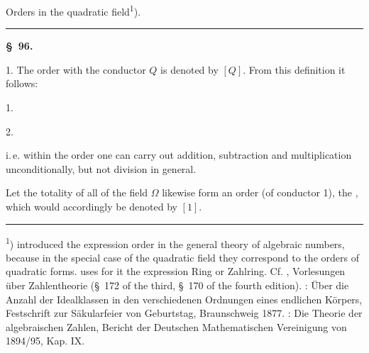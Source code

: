 
\begin{center}

Orders in the quadratic field\textsuperscript{1}).
\end{center}

\rule{3cm}{0.4pt}

\begin{center}
\textbf{\S\ 96. }
\end{center}

1.  The order with the conductor $Q$ is denoted by $[Q]$. From this definition it follows:

1. 

2. 

i.\,e. within the order one can carry out addition, subtraction and multiplication unconditionally, but not division in general.

Let the totality of all  of the field $\Omega$ likewise form an order (of conductor 1), the , which would accordingly be denoted by $[1]$.

\rule{4cm}{0.4pt}

\textsuperscript{1})  introduced the expression order in the general theory of algebraic numbers, because in the special case of the quadratic field they correspond to the  orders of quadratic forms.  uses for it the expression \glqq Ring\grqq{} or \glqq Zahlring\grqq{}. Cf. , Vorlesungen über Zahlentheorie (\S\ 172 of the third, \S\ 170 of the fourth edition). : Über die Anzahl der Idealklassen in den verschiedenen Ordnungen eines endlichen Körpers, Festschrift zur Säkularfeier von  Geburtstag, Braunschweig 1877. : Die Theorie der algebraischen Zahlen, Bericht der Deutschen Mathematischen Vereinigung von 1894/95, Kap. IX.
